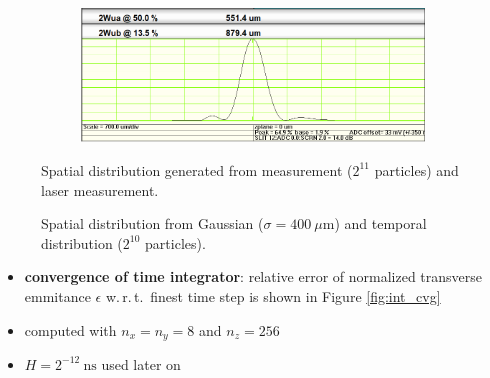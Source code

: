 \begin{center}
\begin{figure}[H]
   \begin{subfigure}{0.4\textwidth}
      
   \end{subfigure}
   \qquad \qquad \qquad
   \begin{subfigure}{0.5\textwidth}
      \includegraphics[width=\textwidth]{fig/laser}
   \end{subfigure}
   \caption{Spatial distribution generated from measurement ($2^{11}$ particles) and laser measurement.}
   \label{fig:gen_sp}
\end{figure}
\end{center}

\begin{center}
\begin{figure}[H]
   \begin{subfigure}{0.4\textwidth}
      
   \end{subfigure}
   \qquad \qquad \qquad
   \begin{subfigure}{0.4\textwidth}
      
   \end{subfigure}
   \caption{Spatial distribution from Gaussian ($\sigma = 400\ \mu \mathrm{m}$) and temporal distribution ($2^{10}$ particles).}
   \label{fig:gen_tmp}
\end{figure}
\end{center}

\newpage

\begin{itemize}
   \item \textbf{convergence of time integrator}: relative error of normalized transverse emmitance $\epsilon$ w.\,r.\,t.\ finest time step is shown in Figure \ref{fig:int_cvg}
   \item computed with $n_x=n_y=8$ and $n_z=256$
   \item $H=2^{-12}\ \mathrm{ns}$ used later on
\end{itemize}

